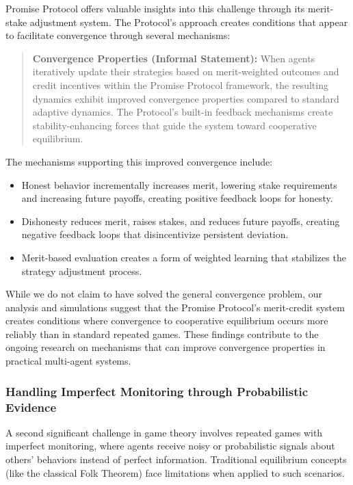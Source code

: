 \documentclass[11pt]{article}
\begin{document}
Promise Protocol offers valuable insights into this challenge through its merit-stake adjustment system. The Protocol's approach creates conditions that appear to facilitate convergence through several mechanisms:

\begin{quote}
\textbf{Convergence Properties (Informal Statement):}
When agents iteratively update their strategies based on merit-weighted outcomes and credit incentives within the Promise Protocol framework, the resulting dynamics exhibit improved convergence properties compared to standard adaptive dynamics. The Protocol's built-in feedback mechanisms create stability-enhancing forces that guide the system toward cooperative equilibrium.
\end{quote}

The mechanisms supporting this improved convergence include:
\begin{itemize}
\item Honest behavior incrementally increases merit, lowering stake requirements and increasing future payoffs, creating positive feedback loops for honesty.
\item Dishonesty reduces merit, raises stakes, and reduces future payoffs, creating negative feedback loops that disincentivize persistent deviation.
\item Merit-based evaluation creates a form of weighted learning that stabilizes the strategy adjustment process.
\end{itemize}

While we do not claim to have solved the general convergence problem, our analysis and simulations suggest that the Promise Protocol's merit-credit system creates conditions where convergence to cooperative equilibrium occurs more reliably than in standard repeated games. These findings contribute to the ongoing research on mechanisms that can improve convergence properties in practical multi-agent systems.
\subsubsection{Handling Imperfect Monitoring through Probabilistic Evidence}
\label{sec:org11a4e02}

A second significant challenge in game theory involves repeated games with imperfect monitoring, where agents receive noisy or probabilistic signals about others' behaviors instead of perfect information. Traditional equilibrium concepts (like the classical Folk Theorem) face limitations when applied to such scenarios.
\end{document}
